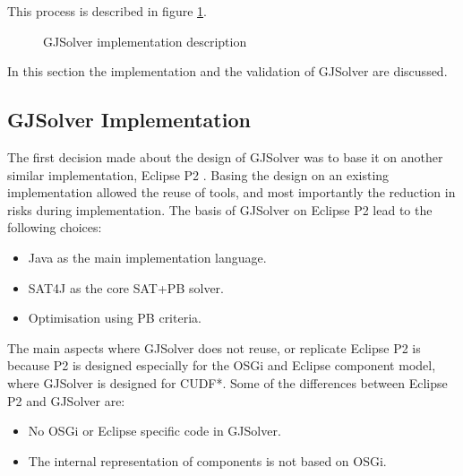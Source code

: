 This process is described in figure \ref{impl.modelofgjsolver}.
\begin{figure}[htp]
\begin{center}
  \caption[labelInTOC]{GJSolver implementation description}
  \label{impl.modelofgjsolver}
\end{center}
\end{figure}

In this section the implementation and the validation of GJSolver are discussed.

\subsection{GJSolver Implementation}
\label{impl.gjsolverimpl}
The first decision made about the design of GJSolver was to base it on another similar implementation, Eclipse P2 \citep{le_berre_dependency_2009,leBerre2010}.
Basing the design on an existing implementation allowed the reuse of tools, and most importantly the reduction in risks during implementation.
The basis of GJSolver on Eclipse P2 lead to the following choices:
\begin{itemize}
  \item Java as the main implementation language.
  \item SAT4J as the core SAT+PB solver.
  \item Optimisation using PB criteria.
\end{itemize}

The main aspects where GJSolver does not reuse, or replicate Eclipse P2 is because P2 is designed especially for the OSGi and Eclipse component model, where GJSolver is designed for CUDF*.
Some of the differences between Eclipse P2 and GJSolver are:
\begin{itemize}
  \item No OSGi or Eclipse specific code in GJSolver.
  \item The internal representation of components is not based on OSGi.
\end{itemize}

